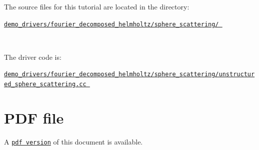 \begin{DoxyItemize}
\item The source files for this tutorial are located in the directory\+:~\newline
~\newline
 \begin{center} \href{../../../../demo_drivers/fourier_decomposed_helmholtz/sphere_scattering}{\tt demo\+\_\+drivers/fourier\+\_\+decomposed\+\_\+helmholtz/sphere\+\_\+scattering/ } \end{center} ~\newline

\item The driver code is\+: ~\newline
~\newline
 \begin{center} \href{../../../../demo_drivers/fourier_decomposed_helmholtz/sphere_scattering/unstructured_sphere_scattering.cc}{\tt demo\+\_\+drivers/fourier\+\_\+decomposed\+\_\+helmholtz/sphere\+\_\+scattering/unstructured\+\_\+sphere\+\_\+scattering.\+cc } \end{center} 
\end{DoxyItemize}



 

 \hypertarget{index_pdf}{}\section{P\+D\+F file}\label{index_pdf}
A \href{../latex/refman.pdf}{\tt pdf version} of this document is available. 
